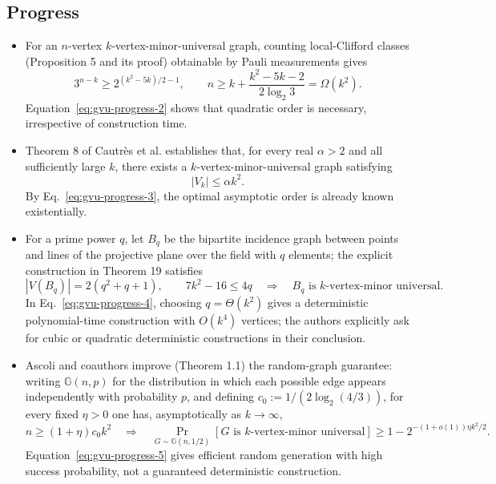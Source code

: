 \subsection*{Progress}

\begin{itemize}
  \item For an $n$-vertex $k$-vertex-minor-universal graph, counting local-Clifford classes (Proposition 5 and its proof) obtainable by Pauli measurements gives
  \begin{equation}
3^{n-k}\geq2^{(k^2-5k)/2-1},
  \qquad
  n\geq k+\frac{k^2-5k-2}{2\log_2 3}
  =\Omega(k^2).
\label{eq:gvu-progress-2}
\end{equation}
  Equation~\eqref{eq:gvu-progress-2} shows that quadratic order is necessary, irrespective of construction time. 

  \item Theorem 8 of Cautrès et al. establishes that, for every real $\alpha>2$ and all sufficiently large $k$, there exists a $k$-vertex-minor-universal graph satisfying
  \begin{equation}
|V_k|\leq\alpha k^2.
\label{eq:gvu-progress-3}
\end{equation}
  By Eq.~\eqref{eq:gvu-progress-3}, the optimal asymptotic order is already known existentially. 

  \item For a prime power $q$, let $B_q$ be the bipartite incidence graph between points and lines of the projective plane over the field with $q$ elements; the explicit construction in Theorem 19 satisfies
  \begin{equation}
|V(B_q)|=2(q^2+q+1),
  \qquad
  7k^2-16\leq4q
  \quad\Longrightarrow\quad
  B_q\text{ is }k\text{-vertex-minor universal}.
\label{eq:gvu-progress-4}
\end{equation}
  In Eq.~\eqref{eq:gvu-progress-4}, choosing $q=\Theta(k^2)$ gives a deterministic polynomial-time construction with $O(k^4)$ vertices; the authors explicitly ask for cubic or quadratic deterministic constructions in their conclusion. 

  \item Ascoli and coauthors improve (Theorem 1.1) the random-graph guarantee: writing $\mathbb G(n,p)$ for the distribution in which each possible edge appears independently with probability $p$, and defining $c_0:=1/(2\log_2(4/3))$, for every fixed $\eta>0$ one has, asymptotically as $k\to\infty$,
  \begin{equation}
n\geq(1+\eta)c_0k^2
  \quad\Longrightarrow\quad
  \Pr_{G\sim\mathbb G(n,1/2)}
  [G\text{ is }k\text{-vertex-minor universal}]
  \geq1-2^{-(1+o(1))\eta k^2/2}.
\label{eq:gvu-progress-5}
\end{equation}
  Equation~\eqref{eq:gvu-progress-5} gives efficient random generation with high success probability, not a guaranteed deterministic construction. 


\end{itemize}
